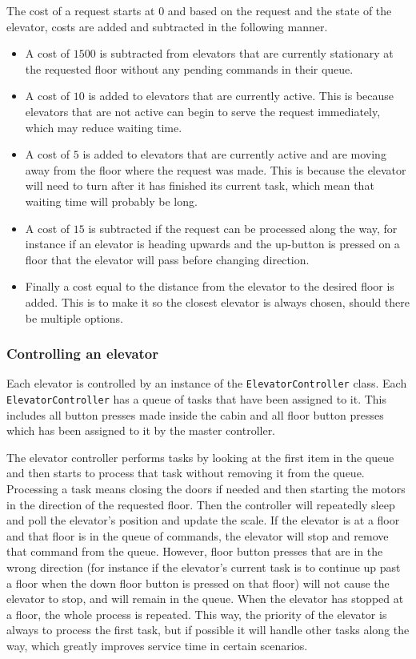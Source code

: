 \documentclass[a4paper]{article}
\begin{document}
The cost of a request starts at $0$ and based on the request and the state of
the elevator, costs are added and subtracted in the following manner.

\begin{itemize}
\item A cost of $1500$ is subtracted from elevators that are currently stationary
    at the requested floor without any pending commands in their queue.
\item A cost of $10$ is added to elevators that are currently active. This is
    because elevators that are not active can begin to serve the request
    immediately, which may reduce waiting time.
\item A cost of $5$ is added to elevators that are currently active and are
    moving away from the floor where the request was made. This is because the
    elevator will need to turn after it has finished its current task, which
    mean that waiting time will probably be long.
\item A cost of $15$ is subtracted if the request can be processed along the
    way, for instance if an elevator is heading upwards and the up-button is
    pressed on a floor that the elevator will pass before changing direction.
\item Finally a cost equal to the distance from the elevator to the desired
    floor is added. This is to make it so the closest elevator is always chosen,
    should there be multiple options.
\end{itemize}

\subsubsection{Controlling an elevator}

Each elevator is controlled by an instance of the \texttt{ElevatorController}
class. Each \texttt{ElevatorController} has a queue of tasks that have been
assigned to it. This includes all button presses made inside the cabin and all
floor button presses which has been assigned to it by the master controller.

The elevator controller performs tasks by looking at the first item in the queue
and then starts to process that task without removing it from the queue.
Processing a task means closing the doors if needed and then starting the motors
in the direction of the requested floor. Then the controller will repeatedly
sleep and poll the elevator's position and update the scale. If the elevator is
at a floor and that floor is in the queue of commands, the elevator will stop
and remove that command from the queue. However, floor button presses that are
in the wrong direction (for instance if the elevator's current task is to
continue up past a floor when the down floor button is pressed on that floor)
will not cause the elevator to stop, and will remain in the queue. When the
elevator has stopped at a floor, the whole process is repeated. This way, the
priority of the elevator is always to process the first task, but if possible it
will handle other tasks along the way, which greatly improves service time in
certain scenarios.
\end{document}
